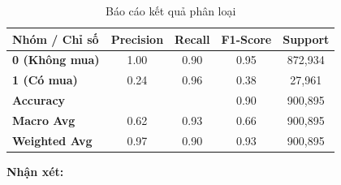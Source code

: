 \documentclass[a4paper,11pt]{article}
\begin{document}
\begin{table}[H]
    \centering
    \caption{Báo cáo kết quả phân loại}
    \label{tab:classification_report}
    \renewcommand{\arraystretch}{1.2} %
    \begin{tabular}{l cccc}
        \toprule
        \textbf{Nhóm / Chỉ số} & \textbf{Precision} & \textbf{Recall} & \textbf{F1-Score} & \textbf{Support} \\
        \midrule
        \textbf{0 (Không mua)} & 1.00 & 0.90 & 0.95 & 872,934 \\
        \textbf{1 (Có mua)}    & 0.24 & 0.96 & 0.38 & 27,961 \\
        \midrule
        \textbf{Accuracy}      & \multicolumn{2}{c}{} & 0.90 & 900,895 \\
        \textbf{Macro Avg}     & 0.62 & 0.93 & 0.66 & 900,895 \\
        \textbf{Weighted Avg}  & 0.97 & 0.90 & 0.93 & 900,895 \\
        \bottomrule
    \end{tabular}
\end{table}
 \textbf{Nhận xét:}
\end{document}
